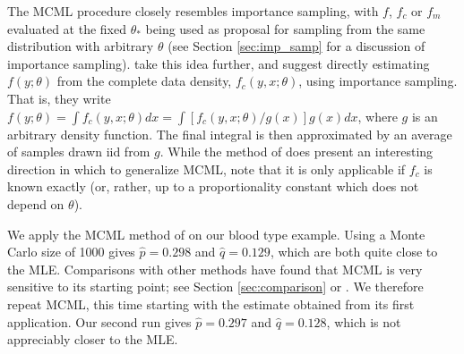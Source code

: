 \documentclass[11pt, oneside]{article}   	%
\begin{document}
The MCML procedure closely resembles importance sampling, with $f$, $f_c$ or $f_m$ evaluated at the fixed $\theta_*$ being used as proposal for sampling from the same distribution with arbitrary $\theta$ (see Section \ref{sec:imp_samp} for a discussion of importance sampling). \citet{Jan03} take this idea further, and suggest directly estimating $f(y; \theta)$ from the complete data density, $f_c(y, x; \theta)$, using importance sampling. That is, they write $f(y; \theta) = \int f_c(y, x; \theta) dx = \int [ f_c(y, x; \theta) / g(x)] g(x) dx$, where $g$ is an arbitrary density function. The final integral is then approximated by an average of samples drawn iid from $g$. While the method of \citeauthor{Jan03} does present an interesting direction in which to generalize MCML, note that it is only applicable if $f_c$ is known exactly (or, rather, up to a proportionality constant which does not depend on $\theta$).

We apply the MCML method of \citet{Gey94} on our blood type example. Using a Monte Carlo size of 1000 gives $\hat{p} = 0.298$ and $\hat{q} = 0.129$, which are both quite close to the MLE. Comparisons with other methods have found that MCML is very sensitive to its starting point; see Section \ref{sec:comparison} or \citet{McC97}. We therefore repeat MCML, this time starting with the estimate obtained from its first application. Our second run gives $\hat{p} = 0.297$ and $\hat{q} = 0.128$, which is not appreciably closer to the MLE.
\end{document}
